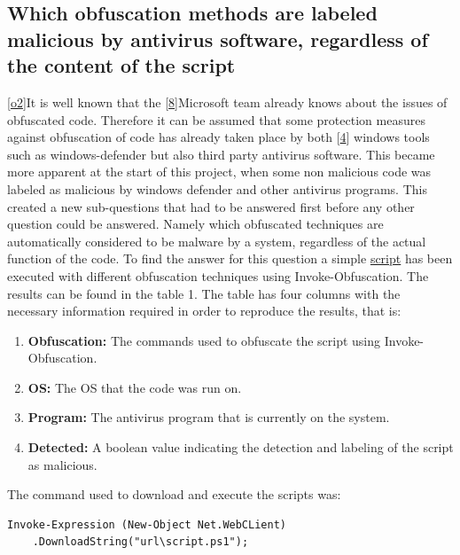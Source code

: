 \documentclass{article}%
\begin{document}
\subsection{Which obfuscation methods are labeled malicious by antivirus software, regardless of the content of the script}
[\hyperlink{o2}{o2}]It is well known that the [\hyperlink{8}{8}]Microsoft team already knows about the issues of obfuscated code. Therefore it can be assumed that some protection measures against obfuscation of code has already taken place by both [\hyperlink{4}{4}] windows tools such as windows-defender but also third party antivirus software. This became more apparent at the start of this project, when some non malicious code was labeled as malicious by windows defender and other antivirus programs. This created a new sub-questions that had to be answered first before any other question could be answered. Namely which obfuscated techniques are automatically considered to be malware by a system, regardless of the actual function of the code. To find the answer for this question a simple \hyperlink{script1}{script} has been executed with different obfuscation techniques using Invoke-Obfuscation. The results can be found in the table 1. The table has four columns with the necessary information required in order to reproduce the results, that is:
\begin{enumerate}
	\item[]\textbf{Obfuscation:} The commands used to obfuscate the script using Invoke-Obfuscation.
	\item[]\textbf{OS:} The OS that the code was run on.
	\item[]\textbf{Program:} The antivirus program that is currently on the system.
	\item[]\textbf{Detected:} A boolean value indicating the detection and labeling of the script as malicious.
\end{enumerate}
The command used to download and execute the scripts was:
\begin{verbatim}
Invoke-Expression (New-Object Net.WebCLient)
    .DownloadString("url\script.ps1");
\end{verbatim}
\end{document}
